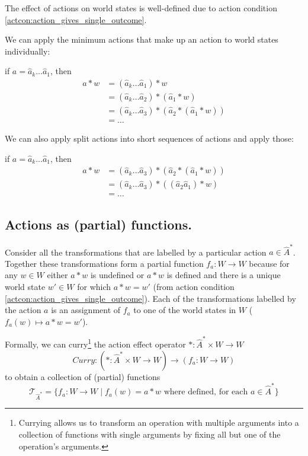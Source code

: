 The effect of actions on world states is well-defined due to action condition \ref{actcon:action_gives_single_outcome}.

We can apply the minimum actions that make up an action to world states individually:

if $a = \hat{a}_{k}...\hat{a}_{1}$, then
\begin{align}
    a \ast w &= (\hat{a}_{k} \dots \hat{a}_{1}) \ast w \\
          &= (\hat{a}_{k} \dots \hat{a}_{2}) \ast (\hat{a}_{1} \ast w) \\
          &= (\hat{a}_{k} \dots \hat{a}_{3}) \ast (\hat{a}_{2} \ast (\hat{a}_{1} \ast w)) \\
          &= \dots
\end{align}

We can also apply split actions into short sequences of actions and apply those:

if $a = \hat{a}_{k}...\hat{a}_{1}$, then
\begin{align}
    a \ast w &= (\hat{a}_{k} \dots \hat{a}_{3}) \ast (\hat{a}_{2} \ast (\hat{a}_{1} \ast w)) \\
          &= (\hat{a}_{k} \dots \hat{a}_{3}) \ast ((\hat{a}_{2} \hat{a}_{1}) \ast w) \\
          &= \dots
\end{align}

\subsection{Actions as (partial) functions.}

Consider all the transformations that are labelled by a particular action $a \in \hat{A}^{\ast}$.
Together these transformations form a partial function $f_{a}: W \to W$ because for any $w \in W$ either $a \ast w$ is undefined or $a \ast w$ is defined and there is a unique world state $w' \in W$ for which $a \ast w = w'$ (from action condition \ref{actcon:action_gives_single_outcome}).
Each of the transformations labelled by the action $a$ is an assignment of $f_{a}$ to one of the world states in $W$ ($f_{a}(w) \mapsto a \ast w = w'$).

Formally, we can curry\footnote{Currying allows us to transform an operation with multiple arguments into a collection of functions with single arguments by fixing all but one of the operation's arguments.} the action effect operator $\ast : \hat{A}^{\ast} \times W \to W$
\begin{equation}
    \textit{Curry}: (\ast: \hat{A}^{\ast} \times W \to W) \to (f_{a}: W \to W)
\end{equation}
to obtain a collection of (partial) functions
\begin{equation}
    \mathcal{T}_{\hat{A}^{\ast}} = \{f_{a}: W \to W \mid f_{a}(w) = a \ast w \text{ where defined, for each } a \in \hat{A}^{\ast} \}
\end{equation}

